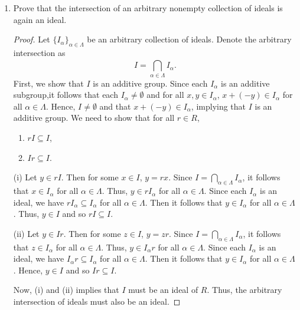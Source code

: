 \documentclass[a4paper]{article}
\begin{document}
\begin{problem}
\begin{enumerate}
\begin{proof}
           Thus, (i) and (ii) imply that \( I  \cap J \) must also be an ideal of \( R  \).
           \end{proof}
        \item[(b)] Prove that the intersection of an arbitrary nonempty collection of ideals is again an ideal.
            \begin{proof}
                Let \( \{ {I}_{\alpha} \}_{\alpha \in \Lambda}  \) be an arbitrary collection of ideals. Denote the arbitrary intersection as 
                \[  I = \bigcap_{ \alpha \in \Lambda }^{  }  {I}_{\alpha}. \]
                First, we show that \( I  \) is an additive group. Since each \( {I}_{\alpha} \) is an additive subgroup,it follows that each \( {I}_{\alpha} \neq \emptyset  \) and for all \( x,y \in {I}_{\alpha} \), \( x + (-y) \in {I}_{\alpha} \) for all \( \alpha \in \Lambda \). Hence, \( I \neq \emptyset  \) and that \( x + (-y) \in {I}_{\alpha}\), implying that \( I  \) is an additive group.
                We need to show that for all \( r \in R  \), 
                \begin{enumerate}
                    \item[(i)] \( r I \subseteq I \),
                    \item[(ii)] \( Ir \subseteq I \).
                \end{enumerate}

                (i) Let \( y \in rI \). Then for some \( x \in I  \), \( y = rx  \). Since \( I = \bigcap_{ \alpha \in \Lambda  }^{  } {I}_{\alpha} \), it follows that \( x \in {I}_{\alpha} \) for all \( \alpha \in \Lambda \). Thus, \( y \in r {I}_{\alpha}  \) for all \( \alpha \in \Lambda \). Since each \( {I}_{\alpha} \) is an ideal, we have \( r {I}_{\alpha} \subseteq {I}_{\alpha} \) for all \( \alpha \in \Lambda \). Then it follows that \( y \in {I}_{\alpha} \) for all \( \alpha \in \Lambda \). Thus, \( y \in I \) and so \( rI \subseteq I \).

                (ii) Let \( y \in Ir \). Then for some \(  z \in I \), \( y = zr \). Since \( I = \bigcap_{ \alpha \in \Lambda  }^{  } {I}_{\alpha} \), it follows that \( z \in {I}_{\alpha}  \) for all \( \alpha \in \Lambda \). Thus, \( y \in {I}_{\alpha}r  \) for all \( \alpha \in \Lambda \). Since each \( {I}_{\alpha} \) is an ideal, we have \(  {I}_{\alpha}r \subseteq {I}_{\alpha} \) for all \( \alpha \in \Lambda \). Then it follows that \( y \in {I}_{\alpha} \) for all \( \alpha \in \Lambda \). Hence, \( y \in I  \) and so \( Ir \subseteq I  \).  

                Now, (i) and (ii) implies that \( I \) must be an ideal of \( R  \). Thus, the arbitrary intersection of ideals must also be an ideal. 
            \end{proof}
   \end{enumerate} 
\end{problem}
\end{document}
